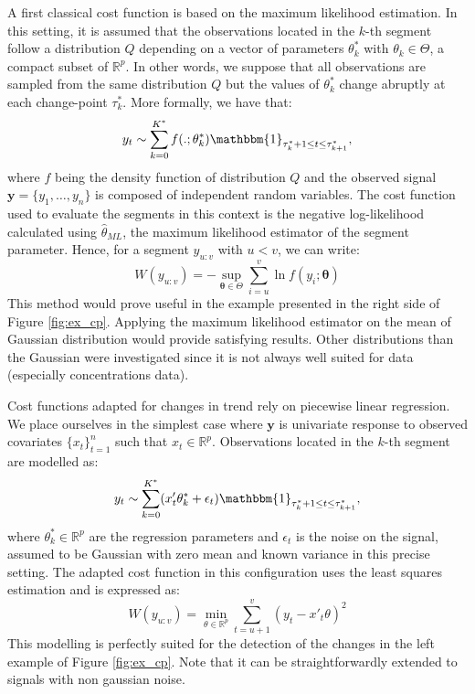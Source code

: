 A first classical cost function is based on the maximum likelihood estimation. In this setting, it is assumed that the observations located in the $k$-th segment follow a distribution $Q$ depending on a vector of parameters $\theta^*_k$ with $\theta_k \in \Theta$, a compact subset of $\mathbb{R}^p$. In other words, we suppose that all observations are sampled from the same distribution $Q$ but the values of $\theta^*_k$ change abruptly at each change-point $\tau^*_k$. 
More formally, we have that:
\begin{equation}
y_t \sim \sum_{k=0}^{K^*}f(.;\theta^*_k)\mathbbm{1}_{\tau^*_{k}+1\leq t \leq \tau^*_{k+1}},
\end{equation}
where $f$ being the density function of distribution $Q$ and the observed signal $\bm y =\{y_1,\dots,y_n\}$ is composed of independent random variables. The cost function used to evaluate the segments in this context is the negative log-likelihood calculated using $\hat\theta_{ML}$, the maximum likelihood estimator of the segment parameter. Hence, for a segment $y_{u:v}$ with $u < v$, we can write:  
\begin{equation}
W(y_{u:v}) = -\sup_{\bm \theta \in \Theta} \sum_{i = u}^{v} \ln f(y_i; \bm \theta)
\end{equation}
This method would prove useful in the example presented in the right side of Figure \ref{fig:ex_cp}. Applying the maximum likelihood estimator on the mean of Gaussian distribution would provide satisfying results. Other distributions than the Gaussian were investigated \citep{maidstone2016,Frick2014} since it is not always well suited for data (especially concentrations data).  

Cost functions adapted for changes in trend rely on piecewise linear regression. We place ourselves in the simplest case where $\bm y$ is univariate response to observed covariates $\{x_t\}_{t=1}^n$ such that $x_t \in \mathbb{R}^p$. Observations located in the $k$-th segment are modelled as: %
\begin{equation}
y_t \sim \sum_{k=0}^{K^*}(x'_t\theta^*_k + \epsilon_t)\mathbbm{1}_{\tau^*_{k}+1\leq t \leq \tau^*_{k+1}},
\end{equation}   
where $\theta^*_k \in \mathbb{R}^p$ are the regression parameters and $\epsilon_t$ is the noise on the signal, assumed to be Gaussian with zero mean and known variance in this precise setting. The adapted cost function in this configuration uses the least squares estimation and is expressed as:
\begin{equation}
W(y_{u:v}) = \min_{\theta \in \mathbb{R}^p}\sum_{t=u+1}^v(y_t-x'_t\theta)^2
\end{equation}
This modelling is perfectly suited for the detection of the changes in the left example of Figure \ref{fig:ex_cp}. Note that it can be straightforwardly extended to signals with non gaussian noise.

